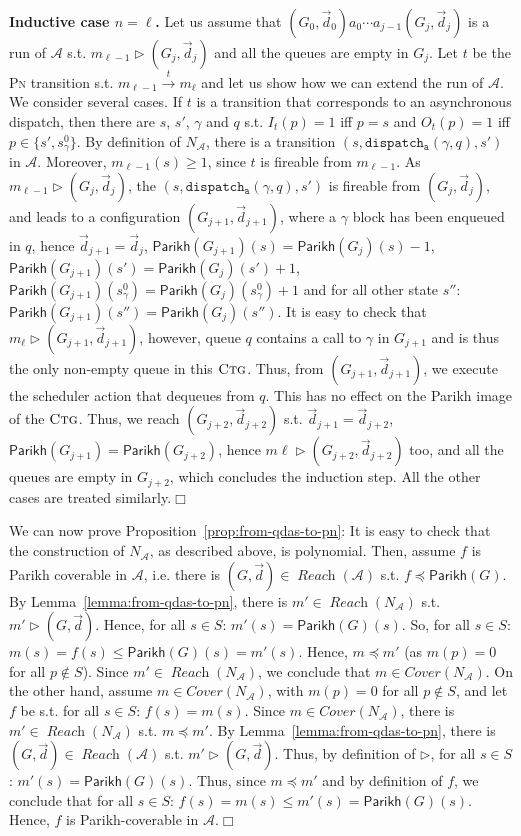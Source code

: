 \documentclass[runningheads,oribibl,]{article}
\newcommand{\mleq}{\preceq}
\newcommand{\Aa}{\ensuremath{\mathcal{A}}\xspace}
\newcommand{\cfont}[1]{\ensuremath{\mathtt{#1}}\xspace}
\newcommand{\pn}{\textsc{Pn}\xspace}
\DeclareMathOperator{\Reach}{\textit{Reach}}
\newcommand{\Cover}{\ensuremath{\textit{Cover}}}
\newcommand{\Data}{\ensuremath{\vec{d}}}
\newcommand{\ctg}{\ensuremath{\textsc{Ctg}}\xspace}
\newcommand{\dispa}{\ensuremath{\cfont{dispatch_a}}}
\newcommand{\Parikh}{\ensuremath{\mathsf{Parikh}}}
\newenvironment{proof}{\noindent{\it Proof.\hspace*{.5cm}}}{}
\newcommand{\qed}{\hfill$\Box$}
\begin{document}
\begin{proof}
  \textbf{Inductive case $n=\ell$.} Let us assume that
  $(G_0,\Data_0)a_0\cdots a_{j-1}(G_j,\Data_j)$ is a run of $\Aa$
  s.t. $m_{\ell-1}\rhd (G_j,\Data_j)$ and all the queues are empty in
  $G_j$. Let $t$ be the \pn transition
  s.t. $m_{\ell-1}\xrightarrow{t}m_\ell$ and let us show how we can
  extend the run of $\Aa$. We consider several cases. If $t$ is a
  transition that corresponds to an asynchronous dispatch, then there
  are $s$, $s'$, $\gamma$ and $q$ s.t. $I_t(p)=1$ iff $p=s$ and
  $O_t(p)=1$ iff $p\in\{s', s^0_\gamma\}$. By definition of $N_\Aa$,
  there is a transition $(s,\dispa(\gamma,q),s')$ in $\Aa$. Moreover,
  $m_{\ell-1}(s)\geq 1$, since $t$ is fireable from $m_{\ell-1}$. As
  $m_{\ell-1}\rhd (G_j,\Data_j)$, the $(s,\dispa(\gamma,q),s')$ is
  fireable from $(G_j,\Data_j)$, and leads to a configuration
  $(G_{j+1}, \Data_{j+1})$, where a $\gamma$ block has been enqueued
  in $q$, hence $\Data_{j+1}=\Data_j$,
  $\Parikh(G_{j+1})(s)=\Parikh(G_j)(s)-1$,
  $\Parikh(G_{j+1})(s')=\Parikh(G_j)(s')+1$,
  $\Parikh(G_{j+1})(s^0_\gamma)=\Parikh(G_j)(s^0_\gamma)+1$ and for
  all other state $s''$: $\Parikh(G_{j+1})(s'')=\Parikh(G_j)(s'')$. It
  is easy to check that $m_\ell\rhd (G_{j+1},\Data_{j+1})$, however,
  queue $q$ contains a call to $\gamma$ in $G_{j+1}$ and is thus the
  only non-empty queue in this \ctg. Thus, from
  $(G_{j+1},\Data_{j+1})$, we execute the scheduler action that
  dequeues from $q$. This has no effect on the Parikh image of the
  \ctg. Thus, we reach $(G_{j+2},\Data_{j+2})$
  s.t. $\Data_{j+1}=\Data_{j+2}$, $\Parikh(G_{j+1})=\Parikh(G_{j+2})$,
  hence $m\ell\rhd (G_{j+2},\Data_{j+2})$ too, and all the queues are
  empty in $G_{j+2}$, which concludes the induction step. All the
  other cases are treated similarly.\qed
\end{proof}


We can now prove Proposition~\ref{prop:from-qdas-to-pn}:
\begin{proof}
  It is easy to check that the construction of $N_\Aa$, as described
  above, is polynomial. Then, assume $f$ is Parikh coverable in $\Aa$,
  i.e. there is $(G,\Data)\in \Reach(\Aa)$
  s.t. $f\mleq \Parikh(G)$. By Lemma~\ref{lemma:from-qdas-to-pn},
  there is $m'\in\Reach(N_\Aa)$ s.t. $m'\rhd (G,\Data)$. Hence, for
  all $s\in S$: $m'(s)=\Parikh(G)(s)$. So, for all $s\in S$:
  $m(s)=f(s)\leq \Parikh(G)(s)=m'(s)$. Hence, $m\mleq m'$ (as $m(p)=0$
  for all $p\not\in S$). Since $m'\in\Reach(N_\Aa)$, we conclude that
  $m\in\Cover(N_\Aa)$. On the other hand, assume $m\in\Cover(N_\Aa)$,
  with $m(p)=0$ for all $p\not\in S$, and let $f$ be s.t. for all
  $s\in S$: $f(s)=m(s)$. Since $m\in\Cover(N_\Aa)$, there is
  $m'\in\Reach(N_\Aa)$ s.t. $m\mleq m'$. By
  Lemma~\ref{lemma:from-qdas-to-pn}, there is
  $(G,\Data)\in\Reach(\Aa)$ s.t. $m'\rhd (G,\Data)$. Thus, by
  definition of $\rhd$, for all $s\in S$: $m'(s)=\Parikh(G)(s)$. Thus,
  since $m\mleq m'$ and by definition of $f$, we conclude that for all
  $s\in S$: $f(s)=m(s)\leq m'(s)=\Parikh(G)(s)$. Hence, $f$ is
  Parikh-coverable in $\Aa$.\qed
\end{proof}
\end{document}
